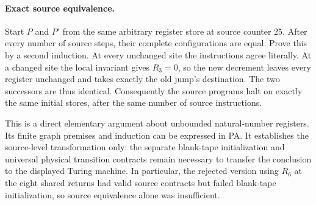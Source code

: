 \paragraph{Exact source equivalence.}
Start $P$ and $P'$ from the same arbitrary register store at source counter
25.  After every number of source steps, their complete configurations
are equal.  Prove this by a second induction.  At every unchanged site
the instructions agree literally.  At a changed site the local invariant
gives $R_3=0$, so the new decrement leaves every register unchanged and
takes exactly the old jump's destination.  The two successors are thus
identical.  Consequently the source programs halt on exactly the same
initial stores, after the same number of source instructions.

This is a direct elementary argument about unbounded natural-number
registers.  Its finite graph premises and induction can be expressed in
PA.  It establishes the source-level transformation only: the separate
blank-tape initialization and universal physical transition contracts
remain necessary to transfer the conclusion to the displayed Turing
machine.  In particular, the rejected version using $R_6$ at the eight
shared returns had valid source contracts but failed blank-tape
initialization, so source equivalence alone was insufficient.
